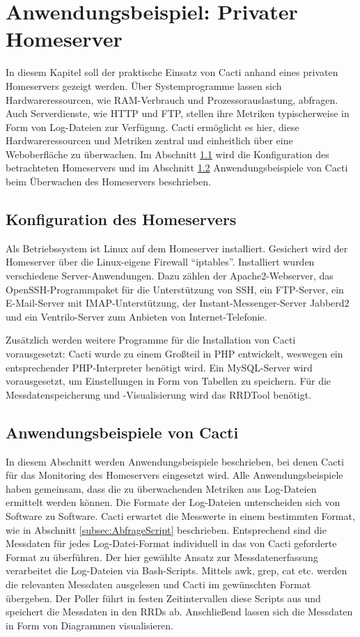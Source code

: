\documentclass[12pt,ngerman,toc=listofnumbered,toc=bibliographynumbered,toc=index,headsepline=true]{scrbook}
\begin{document}
\chapter{Anwendungsbeispiel: Privater Homeserver}
\label{sec:Anwendungsbeispiel}
In diesem Kapitel soll der praktische Einsatz von Cacti anhand eines privaten
Homeservers gezeigt werden. Über Systemprogramme lassen sich Hardwareressourcen,
wie RAM-Verbrauch und Prozessorauslastung, abfragen. Auch Serverdienste, wie
HTTP und FTP, stellen ihre Metriken typischerweise in Form von Log-Dateien zur
Verfügung. Cacti ermöglicht es hier, diese Hardwareressourcen und Metriken
zentral und einheitlich über eine Weboberfläche zu überwachen. Im Abschnitt
\ref{subsec:Konfiguration} wird die Konfiguration des betrachteten Homeservers
und im Abschnitt \ref{subsec:Anwendungsbeispiele} Anwendungsbeispiele von
Cacti beim Überwachen des Homeservers beschrieben.

\section{Konfiguration des Homeservers}
\label{subsec:Konfiguration}
Als Betriebssystem ist Linux auf dem Homeserver installiert. Gesichert wird der
Homeserver über die Linux-eigene Firewall \enquote{iptables}. Installiert wurden
verschiedene Server-Anwendungen. Dazu zählen der Apache2-Webserver, das
OpenSSH-Programmpaket für die Unterstützung von SSH, ein FTP-Server, ein
E-Mail-Server mit IMAP-Unterstützung, der Instant-Messenger-Server Jabberd2 und
ein Ventrilo-Server zum Anbieten von Internet-Telefonie.

Zusätzlich werden weitere Programme für die Installation von Cacti
vorausgesetzt: Cacti wurde zu einem Großteil in PHP entwickelt, weswegen ein
entsprechender PHP-Interpreter benötigt wird. Ein MySQL-Server wird
vorausgesetzt, um Einstellungen in Form von Tabellen zu speichern. Für die
Messdatenspeicherung und -Visualisierung wird das RRDTool benötigt.

\section{Anwendungsbeispiele von Cacti}
\label{subsec:Anwendungsbeispiele}
In diesem Abschnitt werden Anwendungsbeispiele beschrieben, bei denen Cacti für
das Monitoring des Homeservers eingesetzt wird. Alle Anwendungsbeispiele haben
gemeinsam, dass die zu überwachenden Metriken aus Log-Dateien ermittelt werden
können. Die Formate der Log-Dateien unterscheiden sich von Software zu Software.
Cacti erwartet die Messwerte in einem bestimmten Format, wie in Abschnitt
\ref{subsec:AbfrageScript} beschrieben. Entsprechend sind die Messdaten für
jedes Log-Datei-Format individuell in das von Cacti geforderte Format zu
überführen. Der hier gewählte Ansatz zur Messdatenerfassung verarbeitet die
Log-Dateien via Bash-Scripts. Mittels awk, grep, cat etc.
werden die relevanten Messdaten ausgelesen und Cacti im gewünschten Format
übergeben. Der Poller führt in festen Zeitintervallen diese Scripts aus und
speichert die Messdaten in den RRDs ab. Anschließend lassen sich die Messdaten
in Form von Diagrammen visualisieren.
\end{document}
